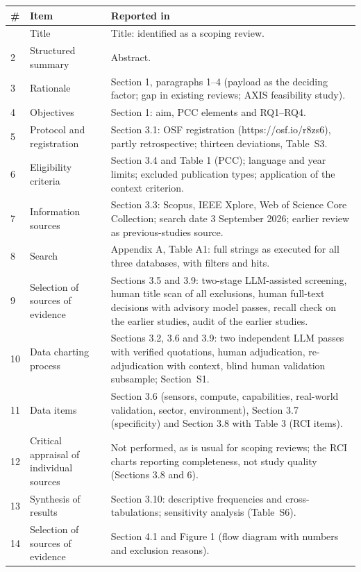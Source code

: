 \documentclass[10pt]{article}
\begin{document}
\begin{longtable}{p{0.3cm}p{4.2cm}p{11.2cm}}
\toprule
\# & Item & Reported in\\
\midrule\endhead
\bottomrule\endfoot
1 & Title & Title: identified as a scoping review.\\
2 & Structured summary & Abstract.\\
3 & Rationale & Section 1, paragraphs 1--4 (payload as the deciding factor; gap in existing reviews; AXIS feasibility study).\\
4 & Objectives & Section 1: aim, PCC elements and RQ1--RQ4.\\
5 & Protocol and registration & Section 3.1: OSF registration (https://osf.io/r8zs6), partly retrospective; thirteen deviations, Table~S3.\\
6 & Eligibility criteria & Section 3.4 and Table 1 (PCC); language and year limits; excluded publication types; application of the context criterion.\\
7 & Information sources & Section 3.3: Scopus, IEEE Xplore, Web of Science Core Collection; search date 3 September 2026; earlier review as previous-studies source.\\
8 & Search & Appendix A, Table A1: full strings as executed for all three databases, with filters and hits.\\
9 & Selection of sources of evidence & Sections 3.5 and 3.9: two-stage LLM-assisted screening, human title scan of all exclusions, human full-text decisions with advisory model passes, recall check on the earlier studies, audit of the earlier studies.\\
10 & Data charting process & Sections 3.2, 3.6 and 3.9: two independent LLM passes with verified quotations, human adjudication, re-adjudication with context, blind human validation subsample; Section~S1.\\
11 & Data items & Section 3.6 (sensors, compute, capabilities, real-world validation, sector, environment), Section 3.7 (specificity) and Section 3.8 with Table 3 (RCI items).\\
12 & Critical appraisal of individual sources & Not performed, as is usual for scoping reviews; the RCI charts reporting completeness, not study quality (Sections 3.8 and 6).\\
13 & Synthesis of results & Section 3.10: descriptive frequencies and cross-tabulations; sensitivity analysis (Table~S6).\\
14 & Selection of sources of evidence & Section 4.1 and Figure 1 (flow diagram with numbers and exclusion reasons).\\

\end{longtable}
\end{document}
